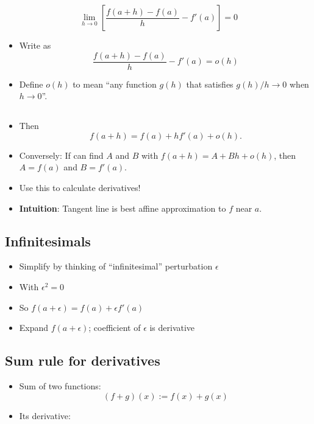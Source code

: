 \[\lim_{h \to 0} \left[ \frac{f(a + h) - f(a)}{h} - f'(a) \right] = 0\]

\begin{itemize}
\item
  Write as \[\frac{f(a + h) - f(a)}{h} - f'(a)  = o(h)\]
\item
  Define \(o(h)\) to mean ``any function \(g(h)\) that satisfies
  \(g(h) / h \to 0\) when \(h \to 0\)''.
\end{itemize}

\hypertarget{section}{%
\subsection{}\label{section}}

\begin{itemize}
\item
  Then \[f(a + h) = f(a) + h f'(a) + o(h).\]
\item
  Conversely: If can find \(A\) and \(B\) with
  \(f(a + h) = A + Bh + o(h)\), then \(A = f(a)\) and \(B = f'(a)\).
\item
  Use this to calculate derivatives!
\item
  \textbf{Intuition}: Tangent line is best affine approximation to \(f\)
  near \(a\).
\end{itemize}

\hypertarget{infinitesimals}{%
\subsection{Infinitesimals}\label{infinitesimals}}

\begin{itemize}
\item
  Simplify by thinking of ``infinitesimal'' perturbation \(\epsilon\)
\item
  With \(\epsilon^2 = 0\)
\item
  So \(f(a + \epsilon) = f(a) + \epsilon f'(a)\)
\item
  Expand \(f(a + \epsilon)\); coefficient of \(\epsilon\) is derivative
\end{itemize}

\hypertarget{sum-rule-for-derivatives}{%
\subsection{Sum rule for derivatives}\label{sum-rule-for-derivatives}}

\begin{itemize}
\item
  Sum of two functions: \[ (f + g)(x) := f(x) + g(x) \]
\item
  Its derivative:
\end{itemize}

